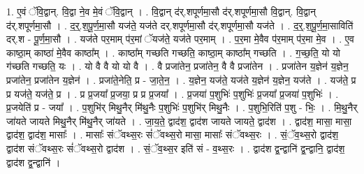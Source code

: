 \documentclass[17pt]{extarticle}
\begin{document}
1. ए॒वं ॅवि॒द्वान्. वि॒द्वा ने॒व मे॒वं ॅवि॒द्वान् । . वि॒द्वान् द॑र्.शपूर्णमा॒सौ द॑र्.शपूर्णमा॒सौ वि॒द्वान्. वि॒द्वान् द॑र्.शपूर्णमा॒सौ । . द॒र्॒.श॒पू॒र्ण॒मा॒सौ यज॑ते॒ यज॑ते दर्.शपूर्णमा॒सौ द॑र्.शपूर्णमा॒सौ यज॑ते । . द॒र्॒.श॒पू॒र्ण॒मा॒साविति॑ दर्.श - पू॒र्ण॒मा॒सौ । . यज॑ते पर॒माम् प॑र॒मां ॅयज॑ते॒ यज॑ते पर॒माम् । . प॒र॒मा मे॒वैव प॑र॒माम् प॑र॒मा मे॒व । . ए॒व काष्ठा॒म् काष्ठा॑ मे॒वैव काष्ठा᳚म् । . काष्ठा᳚म् गच्छति गच्छति॒ काष्ठा॒म् काष्ठा᳚म् गच्छति । . ग॒च्छ॒ति॒ यो यो ग॑च्छति गच्छति॒ यः । . यो वै वै यो यो वै । . वै प्रजा॑तेन॒ प्रजा॑तेन॒ वै वै प्रजा॑तेन । . प्रजा॑तेन य॒ज्ञेन॑ य॒ज्ञेन॒ प्रजा॑तेन॒ प्रजा॑तेन य॒ज्ञेन॑ । . प्रजा॑ते॒नेति॒ प्र - जा॒ते॒न॒ । . य॒ज्ञेन॒ यज॑ते॒ यज॑ते य॒ज्ञेन॑ य॒ज्ञेन॒ यज॑ते । . यज॑ते॒ प्र प्र यज॑ते॒ यज॑ते॒ प्र । . प्र प्र॒जया᳚ प्र॒जया॒ प्र प्र प्र॒जया᳚ । . प्र॒जया॑ प॒शुभिः॑ प॒शुभिः॑ प्र॒जया᳚ प्र॒जया॑ प॒शुभिः॑ । . प्र॒जयेति॑ प्र - जया᳚ । . प॒शुभि॑र् मिथु॒नैर् मि॑थु॒नैः प॒शुभिः॑ प॒शुभि॑र् मिथु॒नैः । . प॒शुभि॒रिति॑ प॒शु - भिः॒ । . मि॒थु॒नैर् जा॑यते जायते मिथु॒नैर् मि॑थु॒नैर् जा॑यते । . जा॒य॒ते॒ द्वाद॑श॒ द्वाद॑श जायते जायते॒ द्वाद॑श । . द्वाद॑श॒ मासा॒ मासा॒ द्वाद॑श॒ द्वाद॑श॒ मासाः᳚ । . मासाः᳚ संॅवथ्स॒रः सं॑ॅवथ्स॒रो मासा॒ मासाः᳚ संॅवथ्स॒रः । . सं॒ॅव॒थ्स॒रो द्वाद॑श॒ द्वाद॑श संॅवथ्स॒रः सं॑ॅवथ्स॒रो द्वाद॑श । . सं॒ॅव॒थ्स॒र इति॑ सं - व॒थ्स॒रः । . द्वाद॑श द्व॒न्द्वानि॑ द्व॒न्द्वानि॒ द्वाद॑श॒ द्वाद॑श द्व॒न्द्वानि॑ । \newline
\end{document}
